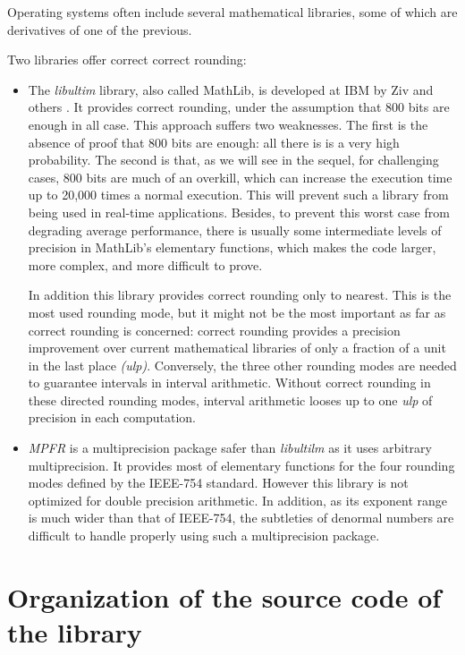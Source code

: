 Operating systems often include several mathematical libraries, some of which are derivatives of one
of the previous.

Two libraries offer correct correct rounding:
\begin{itemize}
\item The \emph{libultim} library, also called MathLib, is developed at
  IBM by Ziv and others \cite{IBMlibultimweb}. It provides correct rounding,
  under the assumption that 800 bits are enough in all case. This
  approach suffers two weaknesses. The first is the absence of proof
  that 800 bits are enough: all there is is a very high probability.
  The second is that, as we will see in the sequel, for challenging
  cases, 800 bits are much of an overkill, which can increase the
  execution time up to 20,000 times a normal execution. This will
  prevent such a library from being used in real-time applications.
  Besides, to prevent this worst case from degrading average
  performance, there is usually some intermediate levels of precision
  in MathLib's elementary functions, which makes the code larger, more
  complex, and more difficult to prove.
  
  In addition this library provides correct rounding only to nearest.
  This is the most used rounding mode, but it might not be the most
  important as far as correct rounding is concerned: correct rounding
  provides a precision improvement over current mathematical libraries
  of only a fraction of a {unit in the last place} \emph{(ulp)}.
  Conversely, the three other rounding modes are needed to guarantee
  intervals in interval arithmetic.  Without correct rounding in these
  directed rounding modes, interval arithmetic looses up to one
  \emph{ulp} of precision in each computation.
  
\item \emph{MPFR} is a multiprecision package safer than
  \emph{libultilm} as it uses arbitrary multiprecision. It provides
  most of elementary functions for the four rounding modes defined by
  the IEEE-754 standard. However this library is not optimized for
  double precision arithmetic. In addition, as its exponent range is
  much wider than that of IEEE-754, the subtleties of denormal numbers
  are difficult to handle properly using such a multiprecision
  package.
\end{itemize}



\section{Organization of the source code of the library}

